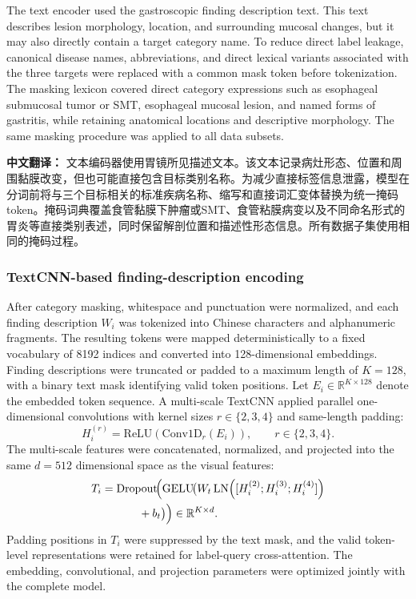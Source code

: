 \documentclass[Afour,sagev,times]{sagej}
\begin{document}
The text encoder used the gastroscopic finding description text. This text describes lesion morphology, location, and surrounding mucosal changes, but it may also directly contain a target category name. To reduce direct label leakage, canonical disease names, abbreviations, and direct lexical variants associated with the three targets were replaced with a common mask token before tokenization. The masking lexicon covered direct category expressions such as esophageal submucosal tumor or SMT, esophageal mucosal lesion, and named forms of gastritis, while retaining anatomical locations and descriptive morphology. The same masking procedure was applied to all data subsets.

\textbf{中文翻译：} 文本编码器使用胃镜所见描述文本。该文本记录病灶形态、位置和周围黏膜改变，但也可能直接包含目标类别名称。为减少直接标签信息泄露，模型在分词前将与三个目标相关的标准疾病名称、缩写和直接词汇变体替换为统一掩码token。掩码词典覆盖食管黏膜下肿瘤或SMT、食管粘膜病变以及不同命名形式的胃炎等直接类别表述，同时保留解剖位置和描述性形态信息。所有数据子集使用相同的掩码过程。

\subsubsection{TextCNN-based finding-description encoding}

After category masking, whitespace and punctuation were normalized, and each finding description $W_i$ was tokenized into Chinese characters and alphanumeric fragments. The resulting tokens were mapped deterministically to a fixed vocabulary of 8192 indices and converted into 128-dimensional embeddings. Finding descriptions were truncated or padded to a maximum length of $K=128$, with a binary text mask identifying valid token positions. Let $E_i\in\mathbb{R}^{K\times128}$ denote the embedded token sequence. A multi-scale TextCNN applied parallel one-dimensional convolutions with kernel sizes $r\in\{2,3,4\}$ and same-length padding:
\begin{equation}
H_i^{(r)}=\mathrm{ReLU}\!\left(\mathrm{Conv1D}_{r}(E_i)\right),
\qquad r\in\{2,3,4\}.
\end{equation}
The multi-scale features were concatenated, normalized, and projected into the same $d=512$ dimensional space as the visual features:
\begin{equation}
\begin{aligned}
T_i={}&\mathrm{Dropout}\!\Bigl(\mathrm{GELU}\!\bigl(
W_t\,\mathrm{LN}\!\left([H_i^{(2)};H_i^{(3)};H_i^{(4)}]\right)\\
&\qquad+b_t\bigr)\Bigr)\in\mathbb{R}^{K\times d}.
\end{aligned}
\end{equation}
Padding positions in $T_i$ were suppressed by the text mask, and the valid token-level representations were retained for label-query cross-attention. The embedding, convolutional, and projection parameters were optimized jointly with the complete model.
\end{document}
